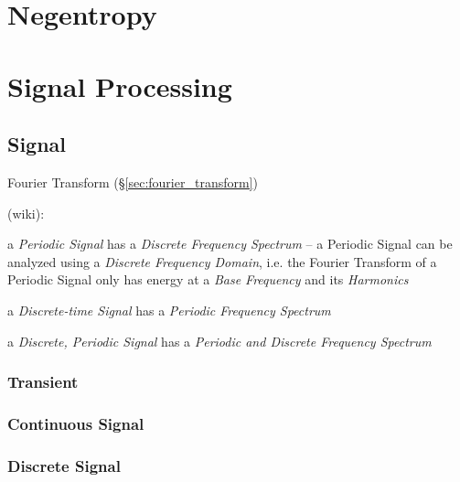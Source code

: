 \section{Negentropy}\label{sec:negentropy}

\section{Signal Processing}\label{sec:signal_processing}

\subsection{Signal}\label{sec:signal}

\fist Fourier Transform (\S\ref{sec:fourier_transform})

(wiki):

a \emph{Periodic Signal} has a \emph{Discrete Frequency Spectrum} -- a Periodic
Signal can be analyzed using a \emph{Discrete Frequency Domain}, i.e. the
Fourier Transform of a Periodic Signal only has energy at a \emph{Base
  Frequency} and its \emph{Harmonics}

a \emph{Discrete-time Signal} has a \emph{Periodic Frequency Spectrum}

a \emph{Discrete, Periodic Signal} has a \emph{Periodic and Discrete Frequency
  Spectrum}



\subsubsection{Transient}\label{sec:transient}

\subsubsection{Continuous Signal}\label{sec:continuous_signal}

\subsubsection{Discrete Signal}\label{sec:discrete_signal}


